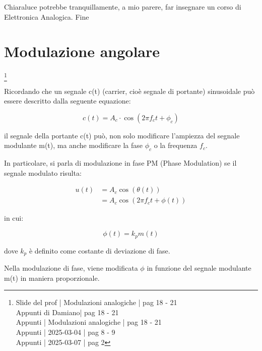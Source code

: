 \begin{tcolorbox}
    Chiaraluce potrebbe tranquillamente, a mio parere, far insegnare un corso di Elettronica Analogica. Fine
\end{tcolorbox}

\newpage 

\section{Modulazione angolare}
\footnote{Slide del prof | Modulazioni analogiche | pag 18 - 21\\  
Appunti di Damiano| pag 18 - 21\\
Appunti | Modulazioni analogiche | pag 18 - 21\\
Appunti | 2025-03-04 | pag 8 - 9 \\
Appunti | 2025-03-07 | pag 2 
} 

Ricordando che un segnale c(t) (carrier, cioè segnale di portante) sinusoidale può essere descritto dalla seguente equazione: 

{
    \Large 
    \begin{equation}
        c(t) = A_c \cdot \cos(2 \pi f_c t + \phi_c)
    \end{equation}
}

il segnale della portante c(t) può, non solo modificare l'ampiezza del segnale modulante m(t), 
ma anche modificare la fase $\phi_c$ o la frequenza $f_c$. \newline 

In particolare, si parla di modulazione in fase PM (Phase Modulation) se il segnale modulato risulta: 

{
    \Large 
    \begin{equation}
        \begin{split}
            u(t)
            &= 
            A_c \cos(\theta (t))
            \\
            &= 
            A_c \cos(2 \pi f_c t + \phi(t))
        \end{split}
    \end{equation}
}

in cui: 

{
    \Large 
    \begin{equation}
        \phi (t) = k_p m(t)
    \end{equation}
}

dove $k_p$ è definito come costante di deviazione di fase. \newline 

Nella modulazione di fase, viene modificata $\phi$ in funzione del segnale modulante m(t) in maniera proporzionale. \newline 

